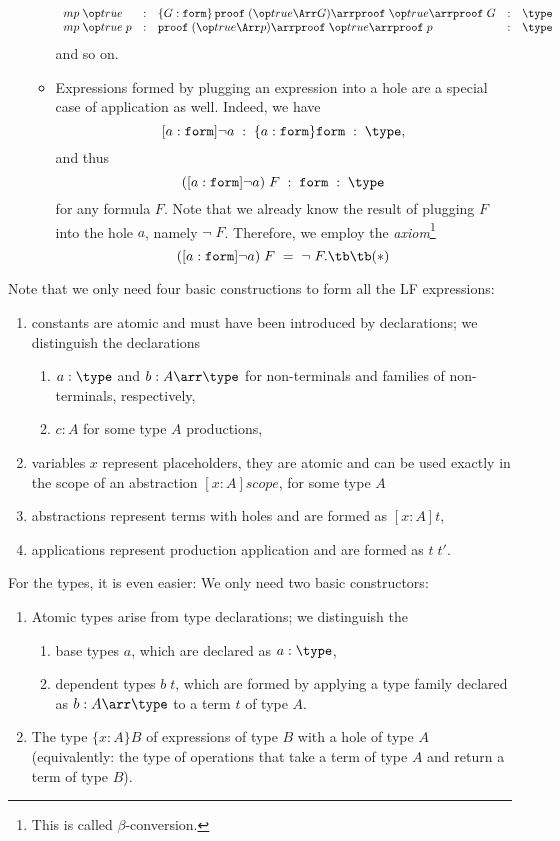 \begin{enumerate}
\begin{itemize}
\[\begin{array}{lclcl}
      mp\;\true & : & \{G:\FORM\}\,\PROOF\;(\true\impl G)\arr \PROOF\;\true\arr\PROOF\;G & : & \type\\
      mp\;\true\;p & : & \PROOF\;(\true\impl p)\arr \PROOF\;\true\arr\PROOF\;p & : & \type\\
    \end{array}\]
    and so on.
    \item Expressions formed by plugging an expression into a hole are a special case of application as well. Indeed, we have
    \[[a:\FORM]\neg a\;:\;\{a:\FORM\}\FORM\;:\;\type,\] and thus
    \[([a:\FORM]\neg a)\;F\;:\;\FORM\;:\;\type\]
    for any formula $F$. Note that we already know the result of plugging $F$ into the hole $a$, namely $\neg\;F$. Therefore, we employ the \emph{axiom}\footnote{This is called $\beta$-conversion.}
    \[([a:\FORM]\neg a)\;F \;=\;\neg\;F. \tb\tb(\ast)\]
  \end{itemize}
\end{enumerate}

\noindent
Note that we only need four basic constructions to form all the LF expressions:
\begin{enumerate}
 \item constants are atomic and must have been introduced by declarations; we distinguish the declarations
   \begin{enumerate}
     \item $a:\type$ and $b:A\arr\type$ for non-terminals and families of non-terminals, respectively,
     \item $c:A$ for some type $A$ productions,
   \end{enumerate}
 \item variables $x$ represent placeholders, they are atomic and can be used exactly in the scope of an abstraction $[x:A]\mathit{scope}$, for some type $A$
 \item abstractions represent terms with holes and are formed as $[x:A]t$,
 \item applications represent production application and are formed as $t\;t'$.
\end{enumerate}

\noindent
For the types, it is even easier: We only need two basic constructors:
\begin{enumerate}
 \item Atomic types arise from type declarations; we distinguish the 
   \begin{enumerate}
     \item base types $a$, which are declared as $a:\type$,
     \item dependent types $b\;t$, which are formed by applying a type family declared as $b:A\arr\type$ to a term $t$ of type $A$.
   \end{enumerate}
 \item The type $\{x:A\}B$ of expressions of type $B$ with a hole of type $A$ (equivalently: the type of operations that take a term of type $A$ and return a term of type $B$).
\end{enumerate}

